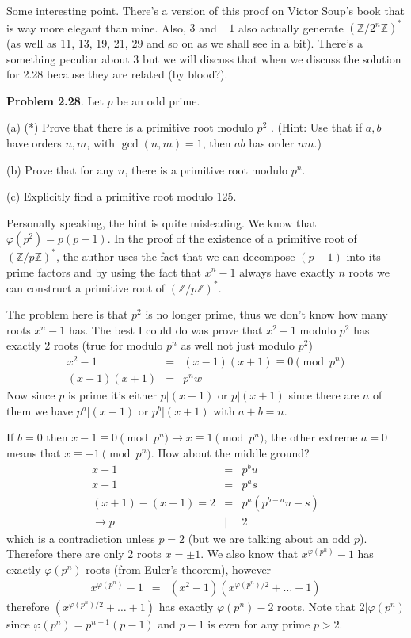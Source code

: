 \documentclass[aps,preprint,preprintnumbers,nofootinbib,showpacs,prd]{revtex4-1}
\newcommand{\nbea}{\begin{eqnarray*}}
\newcommand{\neea}{\end{eqnarray*}}
\begin{document}
Some interesting point. There's a version of this proof on Victor Soup's book that is way more elegant than mine. Also, $3$ and $-1$ also actually generate $(\mathbb{Z}/2^n\mathbb{Z})^*$ (as well as 11, 13, 19, 21, 29 and so on as we shall see in a bit). There's a something peculiar about 3 but we will discuss that when we discuss the solution for 2.28 because they are related (by blood?).

{\bf Problem 2.28}. Let $p$ be an odd prime.

(a) (*) Prove that there is a primitive root modulo $p^2$ . (Hint: Use that if $a, b$ have orders $n, m$, with $\gcd(n, m) = 1$, then $ab$ has order $nm$.)

(b) Prove that for any $n$, there is a primitive root modulo $p^n$.

(c) Explicitly find a primitive root modulo 125.

Personally speaking, the hint is quite misleading. We know that $\varphi(p^2) = p(p-1)$. In the proof of the existence of a primitive root of $(\mathbb{Z}/p\mathbb{Z})^*$, the author uses the fact that we can decompose $(p-1)$ into its prime factors and by using the fact that $x^n-1$ always have exactly $n$ roots we can construct a primitive root of $(\mathbb{Z}/p\mathbb{Z})^*$.

The problem here is that $p^2$ is no longer prime, thus we don't know how many roots $x^n-1$ has. The best I could do was prove that $x^2-1$ modulo $p^2$ has exactly 2 roots (true for modulo $p^n$ as well not just modulo $p^2$)
%
\nbea
x^2-1 & = & (x-1)(x+1) \equiv 0 \pmod{p^n} \\
(x-1)(x+1) & = & p^n w
\neea
%
Now since $p$ is prime it's either $p|(x-1)$ or $p|(x+1)$ since there are $n$ of them we have $p^a|(x-1)$ or $p^b|(x+1)$ with $a+b=n$.

If $b=0$ then $x-1 \equiv 0 \pmod{p^n} \to x \equiv 1 \pmod{p^n}$, the other extreme $a=0$ means that $x \equiv -1 \pmod{p^n}$. How about the middle ground?
%
\nbea
x + 1 & = & p^b u \\
x - 1 & = & p^a s \\
(x+1) - (x-1) = 2 & = & p^a(p^{b-a}u - s) \\
\to p &|& 2
\neea
%
which is a contradiction unless $p=2$ (but we are talking about an odd $p$). Therefore there are only 2 roots $x = \pm 1$. We also know that $x^{\varphi(p^n)}-1$ has exactly $\varphi(p^n)$ roots (from Euler's theorem), however
%
\nbea
x^{\varphi(p^n)}-1 & = & (x^2-1)(x^{\varphi(p^n)/2} + \dots + 1)
\neea
%
therefore $(x^{\varphi(p^n)/2} + \dots + 1)$ has exactly $\varphi(p^n)-2$ roots. Note that $2|\varphi(p^n)$ since $\varphi(p^n) = p^{n-1}(p-1)$ and $p-1$ is even for any prime $p>2$.
\end{document}
